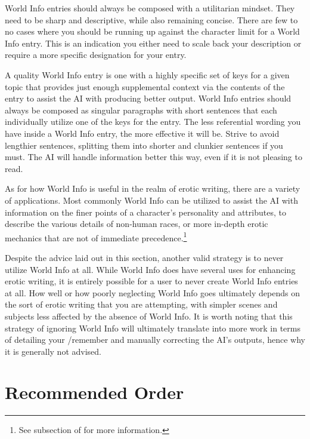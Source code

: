 \documentclass[Source-main.tex]{subfiles}
\begin{document}
World Info entries should always be composed with a utilitarian mindset.
They need to be sharp and descriptive, while also remaining concise.
There are few to no cases where you should be running up against the character limit for a World Info entry.
This is an indication you either need to scale back your description or require a more specific designation for your entry.

A quality World Info entry is one with a highly specific set of keys for a given topic that provides just enough supplemental context via the contents of the entry to assist the AI with producing better output.
World Info entries should always be composed as singular paragraphs with short sentences that each individually utilize one of the keys for the entry.
The less referential wording you have inside a World Info entry, the more effective it will be.
Strive to avoid lengthier sentences, splitting them into shorter and clunkier sentences if you must.
The AI will handle information better this way, even if it is not pleasing to read.


As for how World Info is useful in the realm of erotic writing, there are a variety of applications.
Most commonly World Info can be utilized to assist the AI with information on the finer points of a character’s personality and attributes, to describe the various details of non-human races, or more in-depth erotic mechanics that are not of immediate precedence.\footnote{See  subsection of  for more information.}

Despite the advice laid out in this section, another valid strategy is to never utilize World Info at all.
While World Info does have several uses for enhancing erotic writing, it is entirely possible for a user to never create World Info entries at all.
How well or how poorly neglecting World Info goes ultimately depends on the sort of erotic writing that you are attempting, with simpler scenes and subjects less affected by the absence of World Info.
It is worth noting that this strategy of ignoring World Info will ultimately translate into more work in terms of detailing your /remember and manually correcting the AI’s outputs, hence why it is generally not advised.


\section{Recommended Order}
\end{document}
